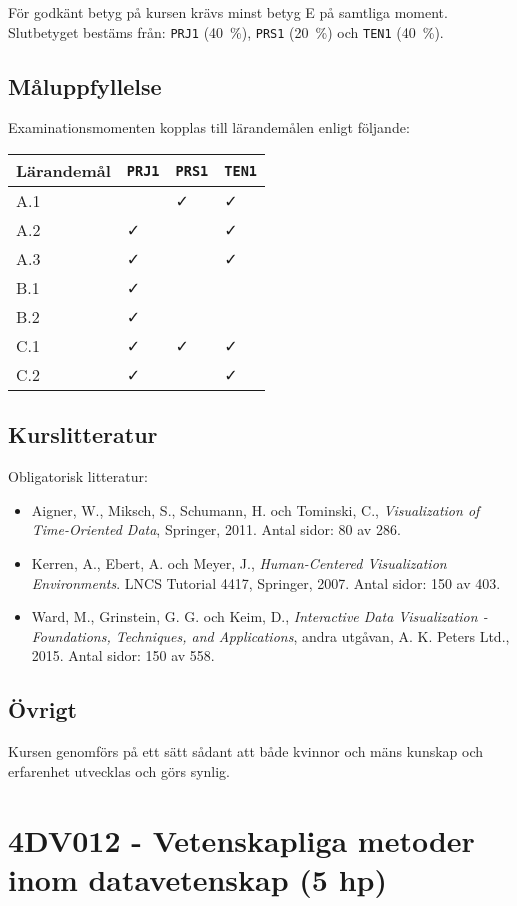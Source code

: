 För godkänt betyg på kursen krävs minst betyg E på samtliga moment.
Slutbetyget bestäms från: \texttt{PRJ1} (40~\%), \texttt{PRS1} (20~\%) och \texttt{TEN1} (40~\%).

\subsection*{Måluppfyllelse}

Examinationsmomenten kopplas till lärandemålen enligt följande:

\begin{longtable}[]{@{}llll@{}}
\toprule
\textsf{Lärandemål} & \texttt{PRJ1} & \texttt{PRS1} & \texttt{TEN1}\tabularnewline
\midrule
\endhead
A.1 & & \faCheck & \faCheck\tabularnewline
A.2 & \faCheck & & \faCheck\tabularnewline
A.3 & \faCheck & & \faCheck\tabularnewline
B.1 & \faCheck & &\tabularnewline
B.2 & \faCheck & &\tabularnewline
C.1 & \faCheck & \faCheck & \faCheck\tabularnewline
C.2 & \faCheck & & \faCheck\tabularnewline
\bottomrule
\end{longtable}

\subsection*{Kurslitteratur}

Obligatorisk litteratur:

\begin{itemize}
\tightlist
\item
  Aigner, W., Miksch, S., Schumann, H. och Tominski, C.,
  \emph{Visualization of Time-Oriented Data}, Springer, 2011. Antal
  sidor: 80 av 286.
\item
  Kerren, A., Ebert, A. och Meyer, J., \emph{Human-Centered
  Visualization Environments}. LNCS Tutorial 4417, Springer, 2007. Antal
  sidor: 150 av 403.
\item
  Ward, M., Grinstein, G. G. och Keim, D., \emph{Interactive Data
  Visualization - Foundations, Techniques, and Applications}, andra
  utgåvan, A. K. Peters Ltd., 2015. Antal sidor: 150 av 558.
\end{itemize}

\subsection*{Övrigt}

Kursen genomförs på ett sätt sådant att både kvinnor och mäns kunskap och erfarenhet utvecklas och görs synlig.
\pagebreak
\section*{4DV012 - Vetenskapliga metoder inom datavetenskap (5 hp)}

